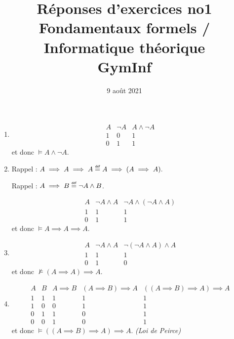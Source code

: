 \documentclass[12pt,french,a4paper]{article}
\newcommand\eqdef{\mathrel{\overset{\makebox[0pt]{\mbox{\normalfont\tiny\sffamily déf}}}{=}}}
\begin{document}
\title{\vspace{-2cm}Réponses d'exercices no1\\\large{Fondamentaux formels / Informatique théorique\\GymInf}}
\date{\vspace{-1cm}9 août 2021}

\maketitle

\begin{question}
\begin{enumerate}

\item \begin{displaymath}
\begin{array}{c|ccc}
A  & \neg A & A \wedge \neg A\\
\hline
1 & 0 & 1\\
0 & 1 & 1
\end{array} 
\end{displaymath}
et donc $\vDash A \wedge \neg A.$

\item Rappel : $A \implies A \implies A \eqdef A \implies (A \implies A).$

Rappel : $A \implies B \eqdef \neg A \wedge B$. 

\begin{displaymath}
\begin{array}{c|ccc}
A  & \neg A \wedge A & \neg A \wedge (\neg A \wedge A)\\
\hline
1 & 1 & 1\\
0 & 1 & 1
\end{array} 
\end{displaymath}
et donc $\vDash A \implies A \implies A.$

\item \begin{displaymath}
\begin{array}{c|ccc}
A  & \neg A \wedge A & \neg (\neg A \wedge A) \wedge A \\
\hline
1 & 1 & 1\\
0 & 1 & 0
\end{array}
\end{displaymath}
et donc $\not\vDash (A \implies A) \implies A.$

\item\begin{displaymath}
\begin{array}{cc|ccc}
A & B & A \implies B & (A \implies B) \implies A &  ((A \implies B) \implies A) \implies A\\
\hline
1 & 1 & 1 & 1 & 1\\
1 & 0 & 0 & 1 & 1\\
0 & 1 & 1 & 0 & 1\\
0 & 0 & 1 & 0 & 1
\end{array}
\end{displaymath}
et donc $\vDash  ((A \implies B) \implies A) \implies A.$ \hfill \emph{(Loi de Peirce)}



\end{enumerate}
\end{question}
\end{document}
